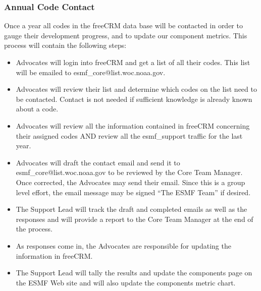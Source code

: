 \subsubsection{Annual Code Contact}
Once a year all codes in the freeCRM data base will be contacted in order to gauge 
their development progress, and to update our component metrics. This process will 
contain the following steps:
\begin{itemize}
\item Advocates will login into freeCRM and get a list of all their codes. 
This list will be emailed to esmf\_core@list.woc.noaa.gov.
\item Advocates will review their list and determine which codes on the list need to be
contacted. Contact is not needed if sufficient knowledge is already known about a 
code.
\item Advocates will review all the information contained in freeCRM concerning their 
assigned codes AND review all the esmf\_support traffic for the last year.  
\item Advocates will draft the contact email and send it to esmf\_core@list.woc.noaa.gov to be 
reviewed by the Core Team Manager.  Once corrected, the Advocates may send their email. Since 
this is a group level effort, the email message may be signed ``The ESMF Team'' if 
desired. 
\item The Support Lead will track the draft and completed emails as well as the 
responses and will provide a report to the Core Team Manager at the end of the 
process.  
\item As responses come in, the Advocates are responsible for updating the 
information in freeCRM.  
\item The Support Lead will tally the results and update the components page on the
ESMF Web site and will also update the components metric chart.  
\end{itemize}


